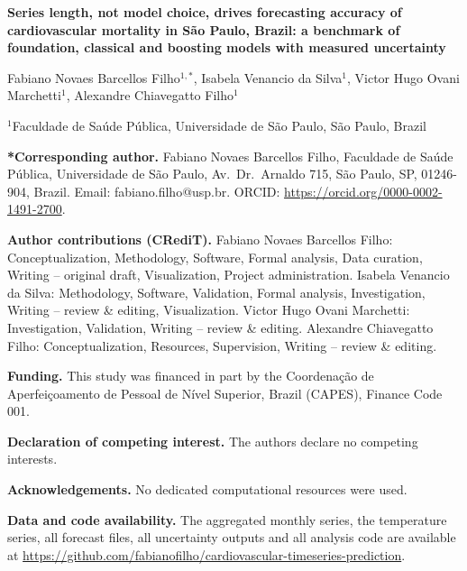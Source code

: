 \documentclass[11pt]{article}
\begin{document}
\begin{center}
{\large\bfseries Series length, not model choice, drives forecasting accuracy of
cardiovascular mortality in S\~ao Paulo, Brazil: a benchmark of foundation, classical and
boosting models with measured uncertainty}

\vspace{1em}
Fabiano Novaes Barcellos Filho$^{1,*}$, Isabela Venancio da Silva$^{1}$,
Victor Hugo Ovani Marchetti$^{1}$, Alexandre Chiavegatto Filho$^{1}$

\vspace{0.5em}
{\small $^{1}$Faculdade de Sa\'ude P\'ublica, Universidade de S\~ao Paulo, S\~ao Paulo, Brazil}
\end{center}

\textbf{*Corresponding author.} Fabiano Novaes Barcellos Filho, Faculdade de Sa\'ude
P\'ublica, Universidade de S\~ao Paulo, Av.~Dr.~Arnaldo 715, S\~ao Paulo, SP, 01246-904,
Brazil. Email: fabiano.filho@usp.br. ORCID: \url{https://orcid.org/0000-0002-1491-2700}.

\textbf{Author contributions (CRediT).} Fabiano Novaes Barcellos Filho: Conceptualization,
Methodology, Software, Formal analysis, Data curation, Writing -- original draft,
Visualization, Project administration. Isabela Venancio da Silva: Methodology, Software,
Validation, Formal analysis, Investigation, Writing -- review \& editing, Visualization. Victor Hugo Ovani Marchetti:
Investigation, Validation, Writing -- review \& editing.
Alexandre Chiavegatto Filho: Conceptualization, Resources, Supervision, Writing -- review
\& editing.

\textbf{Funding.} This study was financed in part by the Coordena\c{c}\~ao de
Aperfei\c{c}oamento de Pessoal de N\'ivel Superior, Brazil (CAPES), Finance Code 001.

\textbf{Declaration of competing interest.} The authors declare no competing interests.

\textbf{Acknowledgements.} No dedicated computational resources were used.

\textbf{Data and code availability.} The aggregated monthly series, the temperature series,
all forecast files, all uncertainty outputs and all analysis code are available at
\url{https://github.com/fabianofilho/cardiovascular-timeseries-prediction}.
\end{document}

